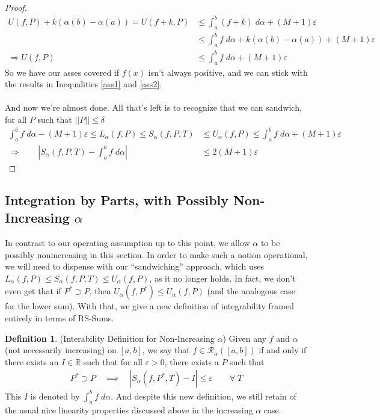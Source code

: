 \documentclass[12pt]{article}
\numberwithin{equation}{section} %
\theoremstyle{plain}
\theoremstyle{definition}
\newtheorem{defn}[thm]{Definition}
\theoremstyle{remark}
\begin{document}
\begin{proof}
\begin{align*}
    U(f,P) + k(\alpha(b)-\alpha(a))
        = U(f+k, P) &\leq \int^b_a (f+k)\; d\alpha
        + (M+1)\varepsilon \\
    &\leq \int^b_a f\; d\alpha  + k(\alpha(b)-\alpha(a))
        + (M+1)\varepsilon \\
    \Rightarrow U(f,P) &\leq \int^b_a f\; d\alpha
        + (M+1)\varepsilon
\end{align*}
So we have our asses covered if $f(x)$ isn't always positive, and we can
stick with the results in Inequalities \ref{ass1} and \ref{ass2}.
\\
\\
And now we're almost done.  All that's left is to recognize that we can
sandwich, for all $P$ such that $||P||\leq\delta$
\begin{align*}
    \int^b_a f\;d\alpha - (M+1)\varepsilon \leq
    L_\alpha(f,P) \leq S_\alpha(f,P,T) &\leq U_\alpha(f,P) \leq
   \int^b_a f\;d\alpha + (M+1)\varepsilon  \\
        \Rightarrow \qquad \left\lvert S_\alpha(f,P,T)
        - \int^b_a f\;d\alpha\right\rvert &\leq 2(M+1)\varepsilon \end{align*}
\end{proof}


\newpage
\subsection{Integration by Parts, with Possibly Non-Increasing $\alpha$}

In contrast to our operating assumption up to this point, we
allow $\alpha$ to be possibly nonincreasing in this section.
In order to make such a notion operational, we will need to dispense
with our ``sandwiching'' approach, which uses $L_\alpha(f,P)\leq
S_\alpha(f,P,T)\leq U_\alpha(f,P)$, as it no longer holds. In fact, we
don't even get that if $P^*\supset P$, then
$U_\alpha(f,P^*) \leq U_\alpha(f,P)$ (and the analogous case for the
lower sum). With that, we give a new definition of integrability framed
entirely in terms of RS-Sums.

\begin{defn}(Interability Definition for Non-Increasing $\alpha$)
Given any $f$ and $\alpha$ (not necessarily increasing) on $[a,b]$, we
say that $f\in\mathscr{R}_\alpha([a,b])$ if and only if there exists an
$I\in\mathbb{R}$ such that for all $\varepsilon>0$, there exists a $P$
such that
\begin{align}
  P^*\supset P
  \quad\implies\quad
  \left\lvert S_\alpha(f,P^*,T) - I \right\rvert \leq
  \varepsilon \qquad \forall \; T
  \label{intdefn}
\end{align}
This $I$ is denoted by $\int^b_a f\;d\alpha$. And despite this new
definition, we still retain of the usual nice linearity properties
discussed above in the increasing $\alpha$ case.
\end{defn}
\end{document}
